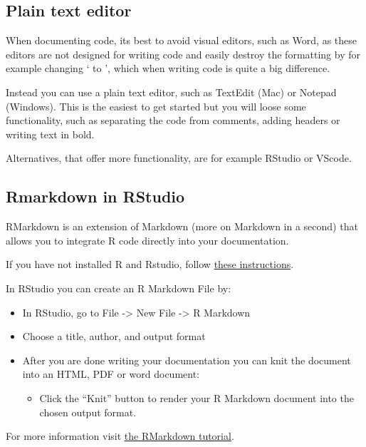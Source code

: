 \documentclass[
  letterpaper,
  DIV=11,
  numbers=noendperiod]{scrreprt}
\providecommand{\tightlist}{%
  \setlength{\itemsep}{0pt}\setlength{\parskip}{0pt}}\usepackage{longtable,booktabs,array}
\begin{document}
\subsection{Plain text editor}\label{plain-text-editor}

When documenting code, its best to avoid visual editors, such as Word,
as these editors are not designed for writing code and easily destroy
the formatting by for example changing ` to ', which when writing code
is quite a big difference.

Instead you can use a plain text editor, such as TextEdit (Mac) or
Notepad (Windows). This is the easiest to get started but you will loose
some functionality, such as separating the code from comments, adding
headers or writing text in bold.

Alternatives, that offer more functionality, are for example RStudio or
VScode.

\subsection{Rmarkdown in RStudio}\label{rmarkdown-in-rstudio}

RMarkdown is an extension of Markdown (more on Markdown in a second)
that allows you to integrate R code directly into your documentation.

If you have not installed R and Rstudio, follow
\href{https://rstudio-education.github.io/hopr/starting.html}{these
instructions}.

In RStudio you can create an R Markdown File by:

\begin{itemize}
\tightlist
\item
  In RStudio, go to File -\textgreater{} New File -\textgreater{} R
  Markdown
\item
  Choose a title, author, and output format
\item
  After you are done writing your documentation you can knit the
  document into an HTML, PDF or word document:

  \begin{itemize}
  \tightlist
  \item
    Click the ``Knit'' button to render your R Markdown document into
    the chosen output format.
  \end{itemize}
\end{itemize}

For more information visit
\href{https://rmarkdown.rstudio.com/lesson-1.html}{the RMarkdown
tutorial}.
\end{document}
